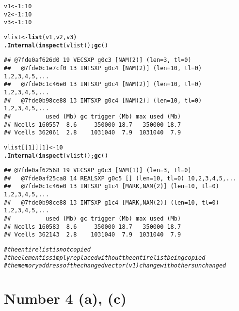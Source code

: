 \documentclass[english]{article}\usepackage[]{graphicx}\usepackage[]{color}
\makeatletter
\newcommand{\hlnum}[1]{\textcolor[rgb]{0.686,0.059,0.569}{#1}}%
\newcommand{\hlcom}[1]{\textcolor[rgb]{0.678,0.584,0.686}{\textit{#1}}}%
\newcommand{\hlopt}[1]{\textcolor[rgb]{0,0,0}{#1}}%
\newcommand{\hlstd}[1]{\textcolor[rgb]{0.345,0.345,0.345}{#1}}%
\newcommand{\hlkwb}[1]{\textcolor[rgb]{0.69,0.353,0.396}{#1}}%
\newcommand{\hlkwd}[1]{\textcolor[rgb]{0.737,0.353,0.396}{\textbf{#1}}}%
\newenvironment{kframe}{%
 \def\at@end@of@kframe{}%
 \ifinner\ifhmode%
  \def\at@end@of@kframe{\end{minipage}}%
  \begin{minipage}{\columnwidth}%
 \fi\fi%
 \def\FrameCommand##1{\hskip\@totalleftmargin \hskip-\fboxsep
 \colorbox{shadecolor}{##1}\hskip-\fboxsep
     \hskip-\linewidth \hskip-\@totalleftmargin \hskip\columnwidth}%
 \MakeFramed {\advance\hsize-\width
   \@totalleftmargin\z@ \linewidth\hsize
   \@setminipage}}%
 {\par\unskip\endMakeFramed%
 \at@end@of@kframe}
\newenvironment{knitrout}{}{} %
\makeatother
\begin{document}
\begin{knitrout}
\color{fgcolor}\begin{kframe}
\begin{alltt}
\hlstd{v1} \hlkwb{<-} \hlnum{1}\hlopt{:}\hlnum{10}
\hlstd{v2} \hlkwb{<-} \hlnum{1}\hlopt{:}\hlnum{10}
\hlstd{v3} \hlkwb{<-} \hlnum{1}\hlopt{:}\hlnum{10}

\hlstd{vlist} \hlkwb{<-} \hlkwd{list}\hlstd{(v1, v2, v3)}
\hlkwd{.Internal}\hlstd{(}\hlkwd{inspect}\hlstd{(vlist));} \hlkwd{gc}\hlstd{()}
\end{alltt}
\begin{verbatim}
## @7fde0af626d0 19 VECSXP g0c3 [NAM(2)] (len=3, tl=0)
##   @7fde0c1e7cf0 13 INTSXP g0c4 [NAM(2)] (len=10, tl=0) 1,2,3,4,5,...
##   @7fde0c1c46e0 13 INTSXP g0c4 [NAM(2)] (len=10, tl=0) 1,2,3,4,5,...
##   @7fde0b98ce88 13 INTSXP g0c4 [NAM(2)] (len=10, tl=0) 1,2,3,4,5,...
##          used (Mb) gc trigger (Mb) max used (Mb)
## Ncells 160557  8.6     350000 18.7   350000 18.7
## Vcells 362061  2.8    1031040  7.9  1031040  7.9
\end{verbatim}
\begin{alltt}
\hlstd{vlist[[}\hlnum{1}\hlstd{]][}\hlnum{1}\hlstd{]} \hlkwb{<-} \hlnum{10}
\hlkwd{.Internal}\hlstd{(}\hlkwd{inspect}\hlstd{(vlist));} \hlkwd{gc}\hlstd{()}
\end{alltt}
\begin{verbatim}
## @7fde0af62568 19 VECSXP g0c3 [NAM(1)] (len=3, tl=0)
##   @7fde0af25ca8 14 REALSXP g0c5 [] (len=10, tl=0) 10,2,3,4,5,...
##   @7fde0c1c46e0 13 INTSXP g1c4 [MARK,NAM(2)] (len=10, tl=0) 1,2,3,4,5,...
##   @7fde0b98ce88 13 INTSXP g1c4 [MARK,NAM(2)] (len=10, tl=0) 1,2,3,4,5,...
##          used (Mb) gc trigger (Mb) max used (Mb)
## Ncells 160583  8.6     350000 18.7   350000 18.7
## Vcells 362143  2.8    1031040  7.9  1031040  7.9
\end{verbatim}
\begin{alltt}
\hlcom{# the entire list is not copied}
\hlcom{# the element is simply replaced without the entire list being copied}
\hlcom{# the memory address of the changed vector (v1) change with others unchanged}
\end{alltt}
\end{kframe}
\end{knitrout}


\section*{Number 4 (a), (c)}
\end{document}
